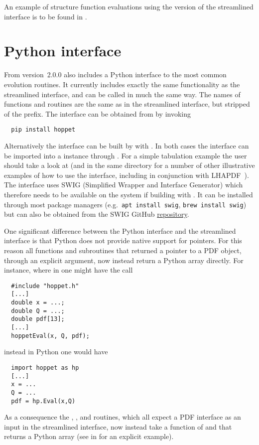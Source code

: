An example of structure function evaluations using the \CPP{} version of
the streamlined interface is to be found in
.
%


\section{Python interface}
\label{sec:pyinterface}
From version~2.0.0 \hoppet also includes a Python interface to the
most common evolution routines. It currently includes exactly the same
functionality as the streamlined interface, and can be called in much
the same way. The names of functions and routines are the same as in
the streamlined interface, but stripped of the 
prefix. The interface can be obtained from  by invoking
\begin{lstlisting}
  pip install hoppet
\end{lstlisting}
Alternatively the interface can be built by  with
. In both cases the interface can
be imported into a  instance through . For a simple tabulation example the user should take a look
at
(and in the same directory for a number of other illustrative examples
of how to use the interface, including in conjunction with
LHAPDF~\cite{LHAPDF}). The interface uses SWIG (Simplified Wrapper and
Interface Generator) which therefore needs to be available on the
system if building with . It can be installed through most
package managers (e.g.\ \texttt{apt install swig}, \texttt{brew
  install swig}) but can also be obtained from the SWIG GitHub
\href{https://github.com/swig}{repository}.

One significant difference between the Python interface and the
streamlined interface is that Python does not provide native support
for pointers. For this reason all functions and subroutines that
returned a pointer to a PDF object, through an explicit argument, now
instead return a Python array directly. For instance, where in \CPP{}
one might have the call
%
\begin{lstlisting}
  #include "hoppet.h"
  [...]
  double x = ...;
  double Q = ...;
  double pdf[13];
  [...]
  hoppetEval(x, Q, pdf);
\end{lstlisting}
%
instead in Python one would have
%
\begin{lstlisting}
  import hoppet as hp
  [...]
  x = ...
  Q = ...
  pdf = hp.Eval(x,Q)
\end{lstlisting}
As a consequence the , , and
 routines, which all expect a PDF interface as an input in
the streamlined interface, now instead take a function of  and
 that returns a Python array (see  in
for an explicit example).

